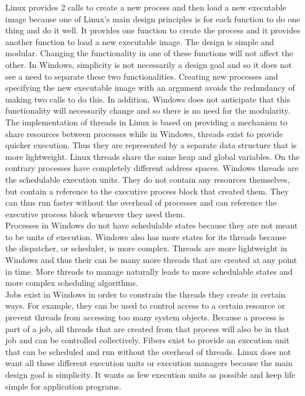 \documentclass[letterpaper,10pt,titlepage]{article}
\begin{document}
\linebreak
Linux provides 2 calls to create a new process and then load a new executable 
image because one of Linux's main design principles is for each function to 
do one thing and do it well. It provides one function to create the process
and it provides another function to load a new executable image. The design 
is simple and modular. Changing the functionality in one of these functions
will not affect the other. In Windows, simplicity is not necessarily a 
design goal and so it does not see a need to separate these two 
functionalities. Creating new processes and specifying the new 
executable image with an argument avoids the redundancy of making two calls
to do this. In addition, Windows does not anticipate that this 
functionality will necessarily change and so there is no need for the 
modularity.
\\
\linebreak
The implementation of threads in Linux is based on providing a mechanism to 
share resources between processes while in Windows, threads exist to provide
quicker execution. Thus they are represented by a separate data structure that 
is more lightweight. Linux threads share the same heap and global variables.
On the contrary processes have completely different address spaces. Windows
threads are the schedulable execution units. They do not contain any 
resources themselves, but contain a reference to the executive process block
that created them. They can thus run faster without the overhead of processes
and can reference the executive process block whenever they need them. 
\\
\linebreak
Processes in Windows do not have schedulable states because they are not 
meant to be units of execution. Windows also has more states for its threads
because the dispatcher, or scheduler, is more complex. Threads are more 
lightweight in Windows and thus their can be many more threads that are 
created at any point in time. More threads to manage naturally leads to
more schedulable states and more complex scheduling algorithms. 
\\
\linebreak
Jobs exist in Windows in order to constrain the threads they create in 
certain ways. For example, they can be used to control access to a certain
resource or prevent threads from accessing too many system objects. Because
a process is part of a job, all threads that are created from that process
will also be in that job and can be controlled collectively. Fibers exist
to provide an execution unit that can be scheduled and run without the
overhead of threads. Linux does not want all these different execution
units or execution managers because the main design goal is simplicity. 
It wants as few execution units as possible and keep life simple for 
application programs.
\end{document}
